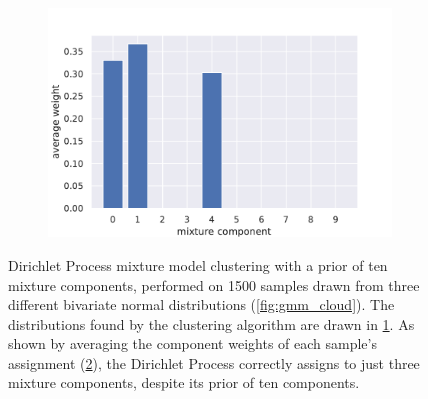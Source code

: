 \begin{figure}[tbp]
\begin{subfigure}[b]{0.49\textwidth}
    \caption{\label{fig:gmm_dist}}
  \end{subfigure}
  \begin{subfigure}[b]{0.75\textwidth}
    \includegraphics[width=\textwidth]{figures/gmm_assignments.pdf}
    \caption{\label{fig:gmm_ass}}
  \end{subfigure}
  \caption{Dirichlet Process mixture model clustering with a prior of ten mixture
    components, performed on 1500 samples drawn from three different bivariate
    normal distributions (\cref{fig:gmm_cloud}). The distributions found by the
    clustering algorithm are drawn in \cref{fig:gmm_dist}. As shown by averaging
    the component weights of each sample's assignment (\cref{fig:gmm_ass}), the
    Dirichlet Process correctly assigns to just three mixture components,
  despite its prior of ten components.\label{fig:gmm_example}}
\end{figure}

